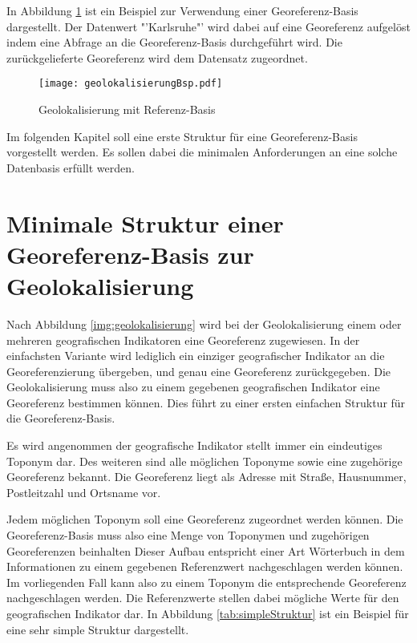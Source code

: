 		In Abbildung \ref{img:geolokalisierungBsp} ist ein Beispiel zur Verwendung einer Georeferenz-Basis dargestellt.
		Der Datenwert "'Karlsruhe"' wird dabei auf eine Georeferenz aufgelöst indem eine Abfrage an die Georeferenz-Basis durchgeführt wird.
		Die zurückgelieferte Georeferenz wird dem Datensatz zugeordnet.

		\begin{figure}[h!]
		\begin{center}
		\texttt{[image: geolokalisierungBsp.pdf]}
		\caption{Geolokalisierung mit Referenz-Basis}
		\label{img:geolokalisierungBsp}
		\end{center}
		\end{figure}	

		Im folgenden Kapitel soll eine erste Struktur für eine Georeferenz-Basis vorgestellt werden.
		Es sollen dabei die minimalen Anforderungen an eine solche Datenbasis erfüllt werden.

	\section{Minimale Struktur einer Georeferenz-Basis zur Geolokalisierung} \label{sec:generelleStruktur} 
		
		Nach Abbildung \ref{img:geolokalisierung} wird bei der Geolokalisierung einem oder mehreren geografischen Indikatoren eine Georeferenz zugewiesen.
		In der einfachsten Variante wird lediglich ein einziger geografischer Indikator an die Georeferenzierung übergeben, und genau eine Georeferenz zurückgegeben.
		Die Geolokalisierung muss also zu einem gegebenen geografischen Indikator eine Georeferenz bestimmen können.
		Dies führt zu einer ersten einfachen Struktur für die Georeferenz-Basis.	

		Es wird angenommen der geografische Indikator stellt immer ein eindeutiges Toponym dar.
		Des weiteren sind alle möglichen Toponyme sowie eine zugehörige Georeferenz bekannt. 
		Die Georeferenz liegt als Adresse mit Straße, Hausnummer, Postleitzahl und Ortsname vor.

		Jedem möglichen Toponym soll eine Georeferenz zugeordnet werden können. 
		Die Georeferenz-Basis muss also eine Menge von Toponymen und zugehörigen Georeferenzen beinhalten
		Dieser Aufbau entspricht einer Art Wörterbuch in dem Informationen zu einem gegebenen Referenzwert nachgeschlagen werden können.
		Im vorliegenden Fall kann also zu einem Toponym die entsprechende Georeferenz nachgeschlagen werden.
		Die Referenzwerte stellen dabei mögliche Werte für den geografischen Indikator dar. 
		In Abbildung \ref{tab:simpleStruktur} ist ein Beispiel für eine sehr simple Struktur dargestellt.

